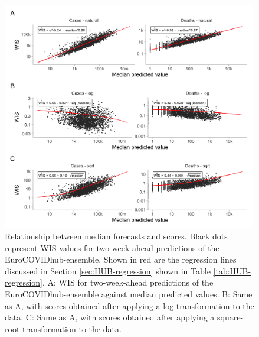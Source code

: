 \documentclass{article}
\begin{document}
\begin{figure}[h!]
    \centering
    \includegraphics[width=0.99\textwidth]{output/figures/HUB-transformation-regression.png}
    \caption{Relationship between median forecasts and scores. Black dots represent WIS values for two-week ahead predictions of the EuroCOVIDhub-ensemble. Shown in red are the regression lines discussed in Section \ref{sec:HUB-regression} shown in Table \ref{tab:HUB-regression}. A: WIS for two-week-ahead predictions of the EuroCOVIDhub-ensemble against median predicted values. B: Same as A, with scores obtained after applying a log-transformation to the data. C: Same as A, with scores obtained after applying a square-root-transformation to the data.} 
    \label{fig:HUB-regression}
\end{figure}
\end{document}
